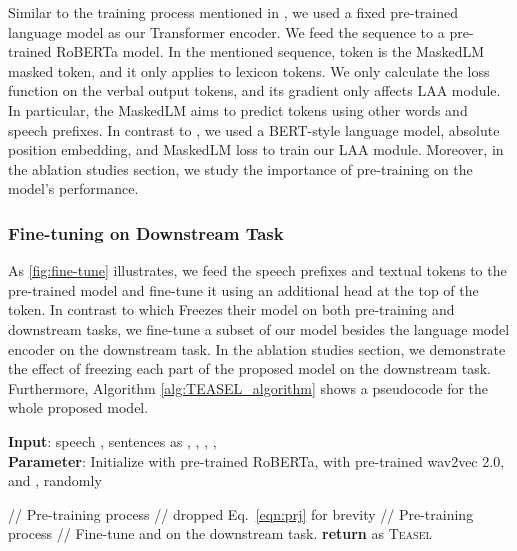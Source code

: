 \documentclass[letterpaper]{article} \usepackage{spconf,amsmath,graphicx}
\newcommand{\teasel}{\textsc{Teasel }}
\begin{document}
Similar to the training process mentioned in \cite{tsimpoukelli2021multimodal}, we used a fixed pre-trained language model as our Transformer encoder. We feed the sequence 
to a pre-trained RoBERTa model. In the mentioned sequence,  token is the MaskedLM masked token, and it only applies to lexicon tokens. We only calculate the loss function on the verbal output tokens, and its gradient only affects LAA module. In particular, the MaskedLM aims to predict  tokens using other words and speech prefixes. In contrast to \cite{tsimpoukelli2021multimodal}, we used a BERT-style language model, absolute position embedding, and MaskedLM loss to train our LAA module. Moreover, in the ablation studies section, we study the importance of pre-training on the model's performance.

\subsubsection{Fine-tuning on Downstream Task}
As \autoref{fig:fine-tune} illustrates, we feed the speech prefixes and textual tokens to the pre-trained model and fine-tune it using an additional head at the top of the  token. In contrast to \cite{tsimpoukelli2021multimodal} which Freezes their model on both pre-training and downstream tasks, we fine-tune a subset of our model besides the language model encoder on the downstream task. In the ablation studies section, we demonstrate the effect of freezing each part of the proposed model on the downstream task.  Furthermore, Algorithm \ref{alg:TEASEL_algorithm} shows a pseudocode for the whole proposed model. 

\begin{algorithm}[tb]
\caption{\teasel Model}
\label{alg:TEASEL_algorithm}
\textbf{Input}: speech , sentences as ,  , , , \\
\textbf{Parameter}: Initialize  with pre-trained RoBERTa,  with pre-trained wav2vec 2.0, and ,  randomly \\
\begin{algorithmic}[1] \STATE 
\STATE 
\STATE // Pre-training process
    \STATE  // dropped Eq.~\ref{eqn:prj} for brevity
    \STATE 
    \STATE 
    \STATE 
    \STATE 
\STATE  
\ENDFOR
\STATE // Pre-training process
\STATE // Fine-tune  and  on the downstream task.
    \STATE 
    \STATE 
    \STATE 
    \STATE 
    \STATE 
    \STATE 
    \STATE  
\ENDFOR
\STATE \textbf{return}  as \teasel
\end{algorithmic}
\end{algorithm}
\end{document}
